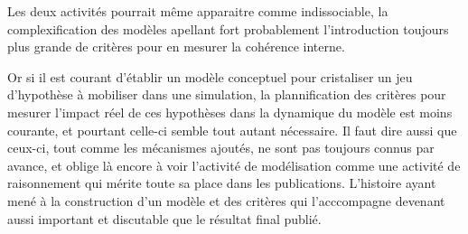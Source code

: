 Les deux activités pourrait même apparaitre comme indissociable, la complexification des modèles apellant fort probablement l'introduction toujours plus grande de critères pour en mesurer la cohérence interne.


Or si il est courant d'établir un modèle conceptuel pour cristaliser un jeu d'hypothèse à mobiliser dans une simulation, la plannification des critères pour mesurer l'impact réel de ces hypothèses dans la dynamique du modèle est moins courante, et pourtant celle-ci semble tout autant nécessaire. Il faut dire aussi que ceux-ci, tout comme les mécanismes ajoutés, ne sont pas toujours connus par avance, et oblige là encore à voir l'activité de modélisation comme une activité de raisonnement qui mérite toute sa place dans les publications. L'histoire ayant mené à la construction d'un modèle et des critères qui l'acccompagne devenant aussi important et discutable que le résultat final publié.


